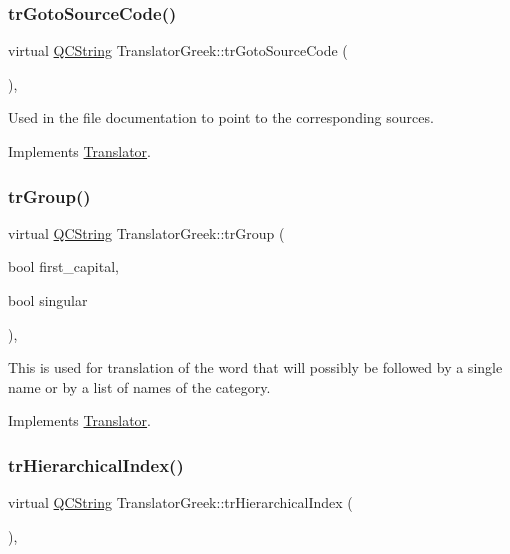 \subsubsection{\texorpdfstring{trGotoSourceCode()}{trGotoSourceCode()}}
{\footnotesize\ttfamily virtual \mbox{\hyperlink{class_q_c_string}{Q\+C\+String}} Translator\+Greek\+::tr\+Goto\+Source\+Code (\begin{DoxyParamCaption}{ }\end{DoxyParamCaption})\hspace{0.3cm}{\ttfamily [inline]}, {\ttfamily [virtual]}}

Used in the file documentation to point to the corresponding sources. 

Implements \mbox{\hyperlink{class_translator}{Translator}}.

\mbox{\label{class_translator_greek_ace0c2736bdab9426536ad9f7db1c47a2}} 
\subsubsection{\texorpdfstring{trGroup()}{trGroup()}}
{\footnotesize\ttfamily virtual \mbox{\hyperlink{class_q_c_string}{Q\+C\+String}} Translator\+Greek\+::tr\+Group (\begin{DoxyParamCaption}\item[{bool}]{first\+\_\+capital,  }\item[{bool}]{singular }\end{DoxyParamCaption})\hspace{0.3cm}{\ttfamily [inline]}, {\ttfamily [virtual]}}

This is used for translation of the word that will possibly be followed by a single name or by a list of names of the category. 

Implements \mbox{\hyperlink{class_translator}{Translator}}.

\mbox{\label{class_translator_greek_ad5ae833189bc03970a6a6e89d1e467a8}} 
\subsubsection{\texorpdfstring{trHierarchicalIndex()}{trHierarchicalIndex()}}
{\footnotesize\ttfamily virtual \mbox{\hyperlink{class_q_c_string}{Q\+C\+String}} Translator\+Greek\+::tr\+Hierarchical\+Index (\begin{DoxyParamCaption}{ }\end{DoxyParamCaption})\hspace{0.3cm}{\ttfamily [inline]}, {\ttfamily [virtual]}}

